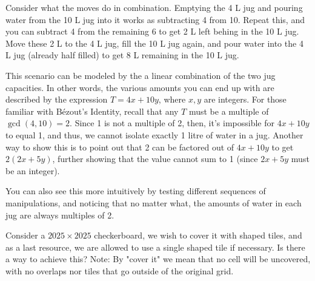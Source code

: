 \begin{solution}
      Consider what the moves do in combination. Emptying the 4 L jug and pouring water from the 10 L jug into it works as subtracting 4 from 10. Repeat this, and you can subtract 4 from the remaining 6 to get 2 L left behing in the 10 L jug. Move these 2 L to the 4 L jug, fill the 10 L jug again, and pour water into the 4 L jug (already half filled) to get 8 L remaining in the 10 L jug. 
    
    This scenario can be modeled by the a linear combination of the two jug capacities. In other words, the various amounts you can end up with are described by the expression \(T = 4x + 10y\), where \(x,y\) are integers. For those familiar with Bézout's Identity, recall that any $T$ must be a multiple of $\gcd(4,10)=2$. Since 1 is not a multiple of 2, then, it's impossible for $4x + 10y$ to equal 1, and thus, we cannot isolate exactly 1 litre of water in a jug. Another way to show this is to point out that 2 can be factored out of $4x + 10y$ to get $2(2x+5y)$, further showing that the value cannot sum to 1 (since $2x+5y$ must be an integer).
    
    You can also see this more intuitively by testing different sequences of manipulations, and noticing that no matter what, the amounts of water in each jug are always multiples of 2.
\end{solution}

\begin{problem}
    Consider a $ 2025 \times 2025 $ checkerboard, we wish to cover it with %
     shaped tiles, and as a last resource, we are allowed to use a single 
     shaped tile if necessary. Is there a way to achieve this?\medbreak
    Note: By "cover it" we mean that no cell will be uncovered, with no overlaps nor tiles that go outside of the original grid.
\end{problem}

